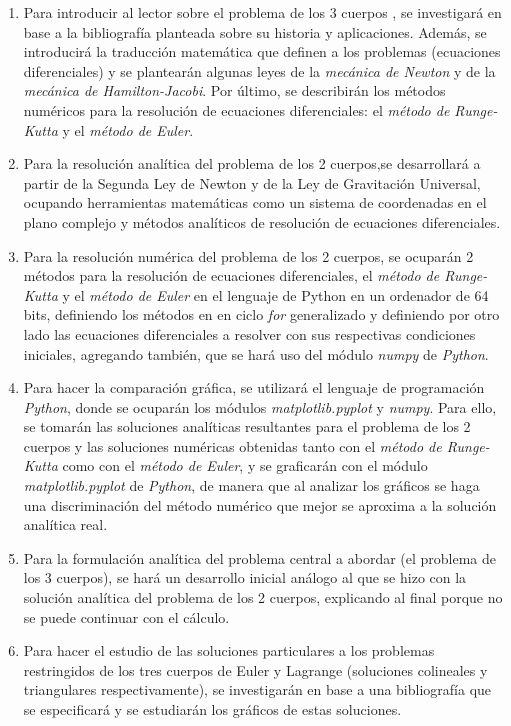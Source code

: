 \documentclass[proyecto.tex]{subfiles}
\begin{document}
\begin{enumerate}
\item Para introducir al lector sobre el problema de los 3 cuerpos , se investigará en base a la bibliografía planteada sobre su historia y aplicaciones. Además, se introducirá la traducción matemática que definen a los problemas (ecuaciones diferenciales) y se plantearán algunas leyes de la \textit{mecánica de Newton} y de la \textit{mecánica de Hamilton-Jacobi}. Por último, se describirán los métodos numéricos para la resolución de ecuaciones diferenciales: el \textit{método de Runge-Kutta} y el \textit{método de Euler}.
\item Para la resolución analítica del problema de los 2 cuerpos,se desarrollará a partir de la Segunda Ley de Newton y de la Ley de Gravitación Universal, ocupando herramientas matemáticas como un sistema de coordenadas en el plano complejo y métodos analíticos de resolución de ecuaciones diferenciales.
\item Para la resolución numérica del problema de los 2 cuerpos, se ocuparán 2 métodos para la resolución de ecuaciones diferenciales, el \textit{método de Runge-Kutta} y el \textit{método de Euler} en el lenguaje de Python en un ordenador de 64 bits, definiendo los métodos en en ciclo \textit{for} generalizado y definiendo por otro lado las ecuaciones diferenciales a resolver con sus respectivas condiciones iniciales, agregando también, que se hará uso del módulo \textit{numpy} de \textit{Python}.
\item Para hacer la comparación gráfica, se utilizará el lenguaje de programación \textit{Python}, donde se ocuparán los módulos \textit{matplotlib.pyplot} y \textit{numpy}. Para ello, se tomarán las soluciones analíticas resultantes para el problema de los 2 cuerpos y las soluciones numéricas obtenidas tanto con el \textit{método de Runge-Kutta} como con el \textit{método de Euler}, y se graficarán con el módulo \textit{matplotlib.pyplot} de \textit{Python}, de manera que al analizar los gráficos se haga una discriminación del método numérico que mejor se aproxima a la solución analítica real.
\item Para la formulación analítica del problema central a abordar (el problema de los 3 cuerpos), se hará un desarrollo inicial análogo al que se hizo con la solución analítica del problema de los 2 cuerpos, explicando al final porque no se puede continuar con el cálculo.
\item Para hacer el estudio de las soluciones particulares a los problemas restringidos de los tres cuerpos de Euler y Lagrange (soluciones colineales y triangulares respectivamente), se investigarán en base a una bibliografía que se especificará y se estudiarán los gráficos de estas soluciones.

\end{enumerate}
\end{document}
